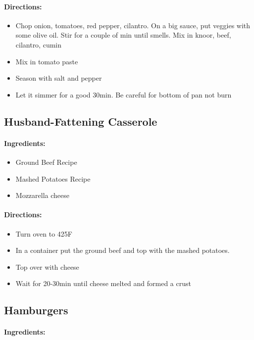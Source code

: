 \documentclass{article}
\begin{document}
\paragraph{Directions:}
\begin{itemize}
	\item Chop onion, tomatoes, red pepper, cilantro. On a big sauce, put veggies with some olive oil. Stir for a couple of min until smells. Mix in knoor, beef, cilantro, cumin 
	\item Mix in tomato paste 
	\item Season with salt and pepper 
	\item Let it simmer for a good 30min. Be careful for bottom of pan not burn
\end{itemize}

\subsection{Husband-Fattening Casserole}

\paragraph{Ingredients:}

\begin{itemize}
	\item Ground Beef Recipe
	\item Mashed Potatoes Recipe
	\item Mozzarella cheese
\end{itemize}

\paragraph{Directions:}
\begin{itemize}
	\item Turn oven to 425F
	\item In a container put the ground beef and top with the mashed potatoes.
	\item Top over with cheese
	\item Wait for 20-30min until cheese melted and formed a crust
\end{itemize}

\subsection{Hamburgers}

\paragraph{Ingredients:}
\end{document}
